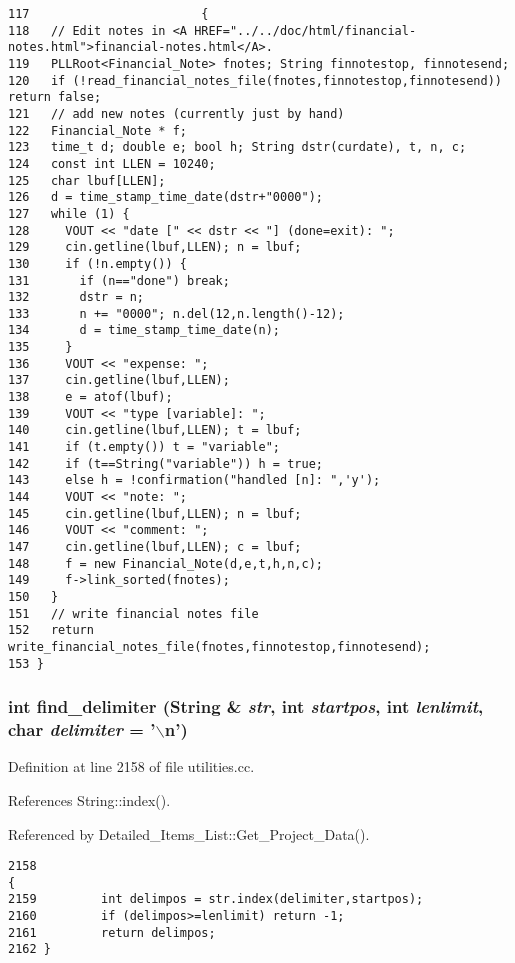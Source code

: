 \footnotesize\begin{verbatim}117                        {
118   // Edit notes in <A HREF="../../doc/html/financial-notes.html">financial-notes.html</A>.
119   PLLRoot<Financial_Note> fnotes; String finnotestop, finnotesend;
120   if (!read_financial_notes_file(fnotes,finnotestop,finnotesend)) return false;
121   // add new notes (currently just by hand)
122   Financial_Note * f;
123   time_t d; double e; bool h; String dstr(curdate), t, n, c;
124   const int LLEN = 10240;
125   char lbuf[LLEN];
126   d = time_stamp_time_date(dstr+"0000");
127   while (1) {
128     VOUT << "date [" << dstr << "] (done=exit): ";
129     cin.getline(lbuf,LLEN); n = lbuf;
130     if (!n.empty()) {
131       if (n=="done") break;
132       dstr = n;
133       n += "0000"; n.del(12,n.length()-12);
134       d = time_stamp_time_date(n);
135     }
136     VOUT << "expense: ";
137     cin.getline(lbuf,LLEN);
138     e = atof(lbuf);
139     VOUT << "type [variable]: ";
140     cin.getline(lbuf,LLEN); t = lbuf;
141     if (t.empty()) t = "variable";
142     if (t==String("variable")) h = true;
143     else h = !confirmation("handled [n]: ",'y');
144     VOUT << "note: ";
145     cin.getline(lbuf,LLEN); n = lbuf;
146     VOUT << "comment: ";
147     cin.getline(lbuf,LLEN); c = lbuf;
148     f = new Financial_Note(d,e,t,h,n,c);
149     f->link_sorted(fnotes);
150   }
151   // write financial notes file
152   return write_financial_notes_file(fnotes,finnotestop,finnotesend);
153 }
\end{verbatim}\normalsize 
{}
\subsubsection{\setlength{\rightskip}{0pt plus 5cm}int find\_\-delimiter ({\bf String} \& {\em str}, int {\em startpos}, int {\em lenlimit}, char {\em delimiter} = '$\backslash$n')\hspace{0.3cm}{\tt  [inline]}}\label{dil2al_8hh_a242}




Definition at line 2158 of file utilities.cc.

References String::index().

Referenced by Detailed\_\-Items\_\-List::Get\_\-Project\_\-Data().



\footnotesize\begin{verbatim}2158                                                                                            {
2159         int delimpos = str.index(delimiter,startpos);
2160         if (delimpos>=lenlimit) return -1;
2161         return delimpos;
2162 }
\end{verbatim}\normalsize 
{}
